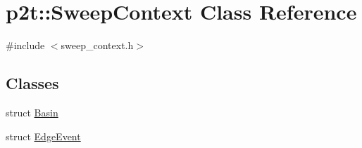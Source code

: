 \hypertarget{classp2t_1_1_sweep_context}{}\section{p2t\+:\+:Sweep\+Context Class Reference}
\label{classp2t_1_1_sweep_context}


{\ttfamily \#include $<$sweep\+\_\+context.\+h$>$}

\subsection*{Classes}
\begin{DoxyCompactItemize}
\item 
struct \hyperlink{structp2t_1_1_sweep_context_1_1_basin}{Basin}
\item 
struct \hyperlink{structp2t_1_1_sweep_context_1_1_edge_event}{Edge\+Event}
\end{DoxyCompactItemize}
